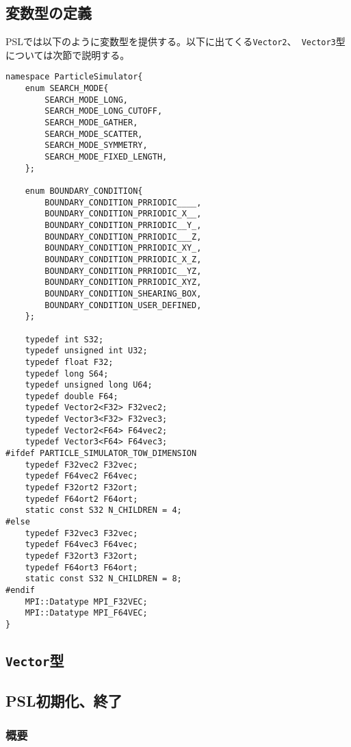 \documentclass[12pt,a4paper]{jarticle}
\begin{document}
\subsection{変数型の定義}
\label{sec:def_variable}

PSLでは以下のように変数型を提供する。以下に出てくる{\tt Vector2}、{\tt
Vector3}型については次節で説明する。

\begin{lstlisting}[caption=変数型]
namespace ParticleSimulator{
    enum SEARCH_MODE{
        SEARCH_MODE_LONG,
        SEARCH_MODE_LONG_CUTOFF,
        SEARCH_MODE_GATHER,
        SEARCH_MODE_SCATTER,
        SEARCH_MODE_SYMMETRY,
        SEARCH_MODE_FIXED_LENGTH,
    };

    enum BOUNDARY_CONDITION{
        BOUNDARY_CONDITION_PRRIODIC____,
        BOUNDARY_CONDITION_PRRIODIC_X__,
        BOUNDARY_CONDITION_PRRIODIC__Y_,
        BOUNDARY_CONDITION_PRRIODIC___Z,
        BOUNDARY_CONDITION_PRRIODIC_XY_,
        BOUNDARY_CONDITION_PRRIODIC_X_Z,
        BOUNDARY_CONDITION_PRRIODIC__YZ,
        BOUNDARY_CONDITION_PRRIODIC_XYZ,
        BOUNDARY_CONDITION_SHEARING_BOX,
        BOUNDARY_CONDITION_USER_DEFINED,
    };

    typedef int S32;
    typedef unsigned int U32;
    typedef float F32;
    typedef long S64;
    typedef unsigned long U64;
    typedef double F64;
    typedef Vector2<F32> F32vec2;
    typedef Vector3<F32> F32vec3;
    typedef Vector2<F64> F64vec2;
    typedef Vector3<F64> F64vec3;
#ifdef PARTICLE_SIMULATOR_TOW_DIMENSION
    typedef F32vec2 F32vec;
    typedef F64vec2 F64vec;
    typedef F32ort2 F32ort;
    typedef F64ort2 F64ort;
    static const S32 N_CHILDREN = 4;
#else
    typedef F32vec3 F32vec;
    typedef F64vec3 F64vec;
    typedef F32ort3 F32ort;
    typedef F64ort3 F64ort;
    static const S32 N_CHILDREN = 8;
#endif
    MPI::Datatype MPI_F32VEC;
    MPI::Datatype MPI_F64VEC;
}
\end{lstlisting}

\subsection{{\tt Vector}型}



\subsection{PSL初期化、終了}

\subsubsection{概要}
\end{document}
